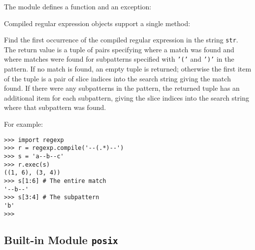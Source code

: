The module defines a function and an exception:


Compiled regular expression objects support a single method:

\begin{description}


Find the first occurrence of the compiled regular expression in the
string {\tt str}.
The return value is a tuple of pairs specifying where a match was
found and where matches were found for subpatterns specified with
{\tt '('} and {\tt ')'} in the pattern.
If no match is found, an empty tuple is returned; otherwise the first
item of the tuple is a pair of slice indices into the search string
giving the match found.
If there were any subpatterns in the pattern, the returned tuple has an
additional item for each subpattern, giving the slice indices into the
search string where that subpattern was found.

\end{description}

For example:
\bcode\begin{verbatim}
>>> import regexp
>>> r = regexp.compile('--(.*)--')
>>> s = 'a--b--c'
>>> r.exec(s)
((1, 6), (3, 4))
>>> s[1:6] # The entire match
'--b--'
>>> s[3:4] # The subpattern
'b'
>>> 
\end{verbatim}\ecode

\subsection{Built-in Module {\tt posix}}

